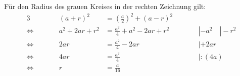 \begin{exercise}
    Für den Radius des grauen Kreises in der rechten Zeichnung gilt:
    \begin{alignat*}{3}
                     &\qquad & (a+r)^2     &=\left(\frac{a}{2}\right)^2+(a-r)^2 & \qquad&                \\[2ex]
      \Leftrightarrow&\qquad & a^2+2ar+r^2 &=\frac{a^2}{4}+a^2-2ar+r^2          & \qquad&|-a^2\quad|-r^2 \\[2ex]
      \Leftrightarrow&\qquad &     2ar     &=\frac{a^2}{4}    -2ar              & \qquad&|+2ar           \\[2ex]
      \Leftrightarrow&\qquad &     4ar     &=\frac{a^2}{4}                      & \qquad&|:(4a)          \\[2ex]
      \Leftrightarrow&\qquad &       r     &=\frac{a}{16}                       & \qquad&
    \end{alignat*}
  \fi
\end{exercise}
